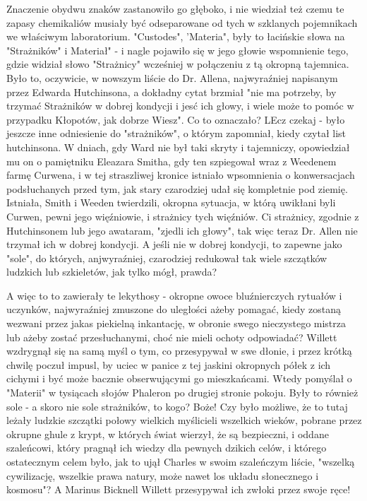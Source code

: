 Znaczenie obydwu znaków zastanowiło go głęboko, i nie wiedział też czemu te zapasy chemikaliów musiały być odseparowane od tych w szklanych pojemnikach we właściwym laboratorium. "Custodes", 'Materia", były to łacińskie słowa na "Strażników" i Materiał" - i nagle pojawiło się w jego głowie wspomnienie tego, gdzie widział słowo "Strażnicy" wcześniej w połączeniu z tą okropną tajemnica. Było to, oczywicie, w nowszym liście do Dr. Allena, najwyraźniej napisanym przez Edwarda Hutchinsona, a dokładny cytat brzmiał "nie ma potrzeby, by trzymać Strażników w dobrej kondycji i jesć ich głowy, i wiele może to pomóc w przypadku Kłopotów, jak dobrze Wiesz". Co to oznaczało? LEcz czekaj - było jeszcze inne odniesienie do "strażników", o którym zapomniał, kiedy czytał list hutchinsona. W dniach, gdy Ward nie był taki skryty i tajemniczy, opowiedział mu on o pamiętniku Eleazara Smitha, gdy ten szpiegował wraz z Weedenem farmę Curwena, i w tej straszliwej kronice istniało wpsomnienia o konwersacjach podsłuchanych przed tym, jak stary czarodziej udał się kompletnie pod ziemię. Istniała, Smith i Weeden twierdzili, okropna sytuacja, w którą uwikłani byli Curwen, pewni jego więźniowie, i strażnicy tych więźniów. Ci strażnicy, zgodnie z Hutchinsonem lub jego awataram, "zjedli ich głowy", tak więc teraz Dr. Allen nie trzymał ich w dobrej kondycji. A jeśli nie w dobrej kondycji, to zapewne jako "sole", do których, anjwyraźniej, czarodziej redukował tak wiele szczątków ludzkich lub szkieletów, jak tylko mógł, prawda?

A więc to to zawierały te lekythosy - okropne owoce bluźnierczych rytuałów i uczynków, najwyraźniej zmuszone do uległości ażeby pomagać, kiedy zostaną wezwani przez jakas piekielną inkantację, w obronie swego nieczystego mistrza lub ażeby zostać przesłuchanymi, choć nie mieli ochoty odpowiadać? Willett wzdrygnął się na samą myśl o tym, co przesypywał w swe dłonie, i przez krótką chwilę poczuł impusl, by uciec w panice z tej jaskini okropnych półek z ich cichymi i być może bacznie obserwującymi go mieszkańcami. Wtedy pomyślał o "Materii" w tysiącach słojów Phaleron po drugiej stronie pokoju. Były to również sole - a skoro nie sole strażników, to kogo? Boże! Czy było możliwe, że to tutaj leżały ludzkie szczątki połowy wielkich myślicieli wszelkich wieków, pobrane przez okrupne ghule z krypt, w których świat wierzył, że są bezpieczni, i oddane szaleńcowi, który pragnął ich wiedzy dla pewnych dzikich celów, i którego ostatecznym celem było, jak to ujął Charles w swoim szaleńczym liście, "wszelką cywilizację, wszelkie prawa natury, może nawet los układu słonecznego i kosmosu"? A Marinus Bicknell Willett przesypywał ich zwłoki przez swoje ręce!



